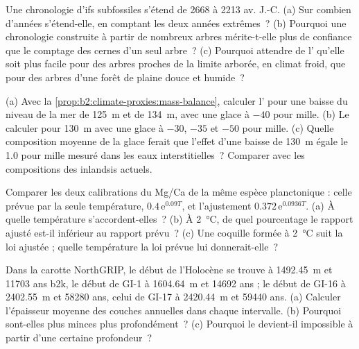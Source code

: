 \begin{exercise}[$\star$]\label{exo:b2:climate-proxies:4}
Une chronologie d'ifs subfossiles s'étend de 2668 à 2213 av. J.-C. (a) Sur combien d'années s'étend-elle,
en comptant les deux années extrêmes~? (b) Pourquoi une chronologie construite à partir de nombreux arbres mérite-t-elle plus de
confiance que le comptage des cernes d'un seul arbre~? (c) Pourquoi attendre de l' qu'elle soit plus facile pour
des arbres proches de la limite arborée, en climat froid, que pour des arbres d'une forêt de plaine douce et humide~?
\end{exercise}

\begin{exercise}[$\star\star$]\label{exo:b2:climate-proxies:5}
(a) Avec la \cref{prop:b2:climate-proxies:mass-balance}, calculer l' pour une baisse
du niveau de la mer de \qty{125}{m} et de \qty{134}{m}, avec une glace à $-40$ pour mille. (b) Le calculer pour
\qty{130}{m} avec une glace à $-30$, $-35$ et $-50$ pour mille. (c) Quelle composition moyenne de la glace
ferait que l'effet d'une baisse de \qty{130}{m} égale le \num{1.0} pour mille mesuré dans les eaux
interstitielles~? Comparer avec les compositions des inlandsis actuels.
\end{exercise}

\begin{exercise}[$\star\star$]\label{exo:b2:climate-proxies:6}
Comparer les deux calibrations du Mg/Ca de la même espèce planctonique : celle prévue par la seule
température, $0.4\,\mathrm{e}^{0.09T}$, et l'ajustement $0.372\,\mathrm{e}^{0.0936T}$. (a) À quelle
température s'accordent-elles~? (b) À \qty{2}{\celsius}, de quel pourcentage le rapport ajusté est-il inférieur
au rapport prévu~? (c) Une coquille formée à \qty{2}{\celsius} suit la loi ajustée ; quelle température la loi prévue
lui donnerait-elle~?
\end{exercise}

\begin{exercise}[$\star\star$]\label{exo:b2:climate-proxies:7}
Dans la carotte NorthGRIP, le début de l'Holocène se trouve à \qty{1492.45}{m} et \num{11703} ans
b2k, le début de GI-1 à \qty{1604.64}{m} et \num{14692} ans ; le début de GI-16 à
\qty{2402.55}{m} et \num{58280} ans, celui de GI-17 à \qty{2420.44}{m} et \num{59440} ans.
(a) Calculer l'épaisseur moyenne des couches annuelles dans chaque intervalle. (b) Pourquoi sont-elles plus minces
plus profondément~? (c) Pourquoi le  devient-il impossible à partir d'une certaine profondeur~?
\end{exercise}

